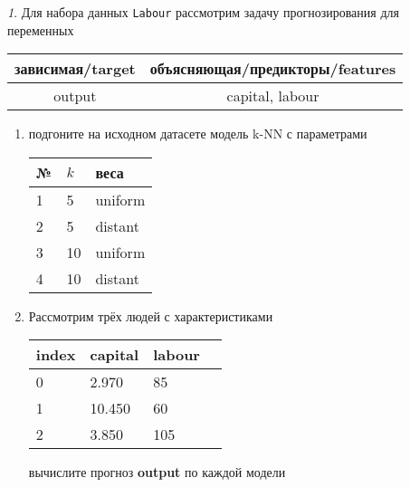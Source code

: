 \documentclass[12pt]{article}
\theoremstyle{remark}
\newtheorem{exercise}{}[section]
\begin{document}
\begin{exercise}
Для набора данных \texttt{Labour} рассмотрим задачу прогнозирования
для переменных
\begin{center}
	\begin{tabular}{|c|c|}\hline
		зависимая/target & объясняющая/предикторы/features \\ \hline
		output & capital, labour \\ \hline
	\end{tabular}
\end{center}
\begin{enumerate}
	\item подгоните на исходном датасете модель k-NN с параметрами
	\begin{center}
		\begin{tabular}{|l|l|l|}\hline
		№ & \(k\) & веса \\ \hline
		1 & 5 & uniform \\
		2 & 5 & distant \\
		3 & 10 & uniform \\
		4 & 10 & distant \\ \hline
		\end{tabular}
	\end{center}
	\item Рассмотрим трёх людей с характеристиками
	\begin{center}
		\begin{tabular}{|l||l||l|l|}\hline
			index & capital & labour \\ \hline\hline
			0 & 2.970 & 85 \\
			1 & 10.450 & 60  \\
			2 & 3.850 & 105 \\ \hline
		\end{tabular}
	\end{center}
	вычислите прогноз \textbf{output} по каждой модели
\end{enumerate}
\end{exercise}
\end{document}
